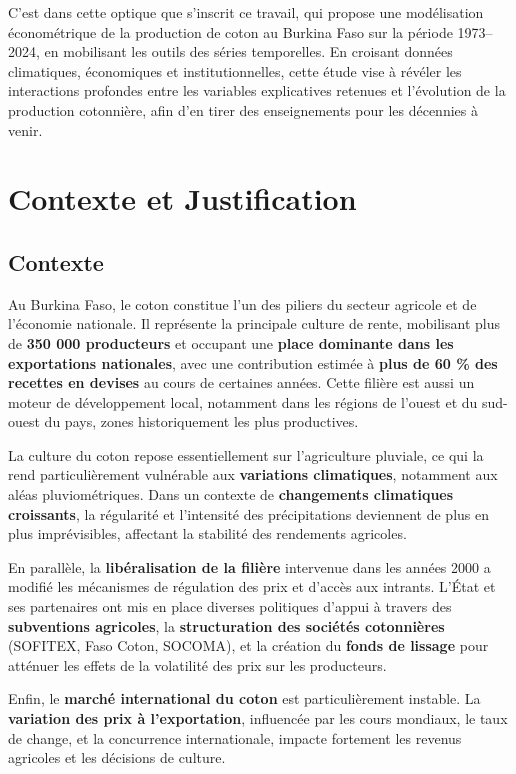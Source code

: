 \documentclass[
  letterpaper,
  DIV=11,
  numbers=noendperiod]{scrartcl}
\begin{document}
C'est dans cette optique que s'inscrit ce travail, qui propose une
modélisation économétrique de la production de coton au Burkina Faso sur
la période 1973--2024, en mobilisant les outils des séries temporelles.
En croisant données climatiques, économiques et institutionnelles, cette
étude vise à révéler les interactions profondes entre les variables
explicatives retenues et l'évolution de la production cotonnière, afin
d'en tirer des enseignements pour les décennies à venir.

\section{Contexte et Justification}\label{contexte-et-justification}

\subsection{Contexte}\label{contexte}

Au Burkina Faso, le coton constitue l'un des piliers du secteur agricole
et de l'économie nationale. Il représente la principale culture de
rente, mobilisant plus de \textbf{350 000 producteurs} et occupant une
\textbf{place dominante dans les exportations nationales}, avec une
contribution estimée à \textbf{plus de 60 \% des recettes en devises} au
cours de certaines années. Cette filière est aussi un moteur de
développement local, notamment dans les régions de l'ouest et du
sud-ouest du pays, zones historiquement les plus productives.

La culture du coton repose essentiellement sur l'agriculture pluviale,
ce qui la rend particulièrement vulnérable aux \textbf{variations
climatiques}, notamment aux aléas pluviométriques. Dans un contexte de
\textbf{changements climatiques croissants}, la régularité et
l'intensité des précipitations deviennent de plus en plus imprévisibles,
affectant la stabilité des rendements agricoles.

En parallèle, la \textbf{libéralisation de la filière} intervenue dans
les années 2000 a modifié les mécanismes de régulation des prix et
d'accès aux intrants. L'État et ses partenaires ont mis en place
diverses politiques d'appui à travers des \textbf{subventions
agricoles}, la \textbf{structuration des sociétés cotonnières} (SOFITEX,
Faso Coton, SOCOMA), et la création du \textbf{fonds de lissage} pour
atténuer les effets de la volatilité des prix sur les producteurs.

Enfin, le \textbf{marché international du coton} est particulièrement
instable. La \textbf{variation des prix à l'exportation}, influencée par
les cours mondiaux, le taux de change, et la concurrence internationale,
impacte fortement les revenus agricoles et les décisions de culture.
\end{document}
